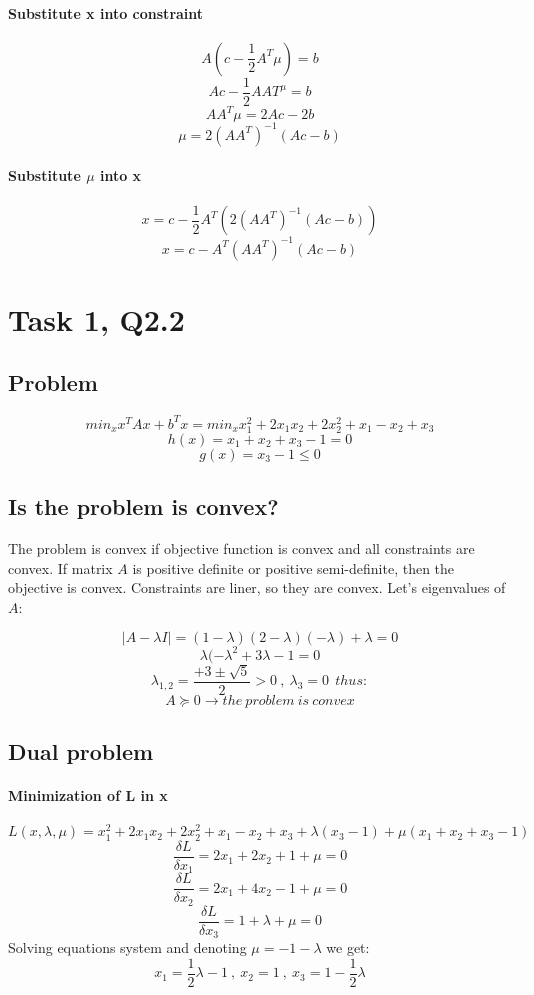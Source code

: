 \documentclass[12pt]{article}
\begin{document}
\paragraph{Substitute x into constraint}
\[A(c- \frac{1}{2} A^T \mu) = b\]
\[Ac - \frac{1}{2} AAT^ \mu = b\]
\[AA^T \mu = 2Ac - 2b\]
\[\mu = 2 (AA^T)^{-1} (Ac - b)\]
\paragraph{Substitute $\mu$ into x}
\[x = c - \frac{1}{2} A^T ( 2 ( AA^T )^{-1} ( Ac - b ) ) \] 
\[x = c -  A^T (AA^T)^{-1} (Ac - b)\]  

\newpage
\section{Task 1, Q2.2}
\subsection{Problem}
\[min_x x^T A x + b^T x = min_x x_1 ^2 + 2 x_1 x_2 + 2 x_2 ^2 + x_1 - x_2 + x_3 \]
\[h(x)= x_1 + x_2 + x_3 - 1 = 0\]
\[g(x)= x_3 - 1 \leq 0 \]
\subsection{Is the problem is convex?}
The problem is convex if objective function is convex and all constraints are convex. If matrix $A$ is positive definite or positive semi-definite, then the objective is convex. Constraints are liner, so they are convex. Let's eigenvalues of $A$:

\[|A- \lambda I | = (1- \lambda)(2 -\lambda)(-\lambda)+ \lambda = 0 \]
\[\lambda (- \lambda ^2 + 3 \lambda - 1  = 0\]
\[\lambda_{1,2} = \frac{+3 \pm \sqrt{5}}{2} > 0 \ , \ \lambda_3 = 0 \ \ thus: \]
\[A \succeq 0 \longrightarrow the \ problem \ is \ convex \]

\subsection{Dual problem}
\paragraph{Minimization of L in x}
\[L(x, \lambda, \mu) = x_1 ^2 + 2 x_1 x_2 + 2 x_2 ^2 + x_1 - x_2 + x_3 + \lambda (x_3 - 1) + \mu (x_1 + x_2 + x_3 - 1)\]
\[\frac{\delta L}{\delta x_1} = 2x_1 + 2x_2 + 1 + \mu = 0 \]
\[\frac{\delta L}{\delta x_2} = 2x_1 + 4x_2 - 1 + \mu = 0 \]
\[\frac{\delta L}{\delta x_3} = 1 + \lambda + \mu = 0\]
Solving equations system and denoting $\mu = -1 -\lambda$ we get:
\[x_1 = \frac{1}{2} \lambda -1 \ , \ x_2 =1 \ , \ x_3 = 1 - \frac{1}{2} \lambda\]
\end{document}
